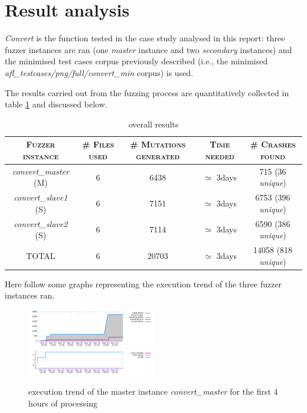 \section{Result analysis}
\label{sec:res}

\textit{Convert} is the function tested in the case study analysed in this report: three fuzzer instances are ran (one \textit{master} instance and two \textit{secondary} instances) and the minimised test cases corpus previously described (i.e., the minimised \textit{afl\_testcases/png/full/convert\_min} corpus) is used.

The results carried out from the fuzzing process are quantitatively collected in table \ref{tab:convert_results} and discussed below.

\begin{table}[H]
    \centering
    \begin{tabular}{|c|c|c|c|c|}
        \hline
        \cellcolor{lightgray}\textsc{Fuzzer instance} & \cellcolor{lightgray}\textsc{\# Files used} & \cellcolor{lightgray}\textsc{\# Mutations generated} & \cellcolor{lightgray}\textsc{Time needed} & \cellcolor{lightgray}\textsc{\# Crashes found} \\
        \hline
        \textit{convert\_master} (M) & 6 & 6438 & $\simeq$ 3days & 715 (36 \textit{unique})\\
        \hline
        \textit{convert\_slave1} (S) & 6 & 7151 & $\simeq$ 3days & 6753 (396 \textit{unique}) \\
        \hline
        \textit{convert\_slave2} (S) & 6 & 7114 & $\simeq$ 3days & 6590 (386 \textit{unique}) \\
        \hline
        TOTAL & 6 & 20703 & $\simeq$ 3days & 14058 (818 \textit{unique}) \\
        \hline
    \end{tabular}
    \caption{overall results}
    \label{tab:convert_results}
\end{table}

Here follow some graphs representing the execution trend of the three fuzzer instances ran.

\begin{figure}[H]
    \centering
    \includegraphics[width=0.5\textwidth]{Resources/convert_master/high_freq.png}\hfill
    \includegraphics[width=0.5\textwidth]{Resources/convert_master/low_freq.png}
    \caption{execution trend of the master instance \textit{convert\_master} for the first 4 hours of processing}
    \label{fig:convert_master}
\end{figure}

